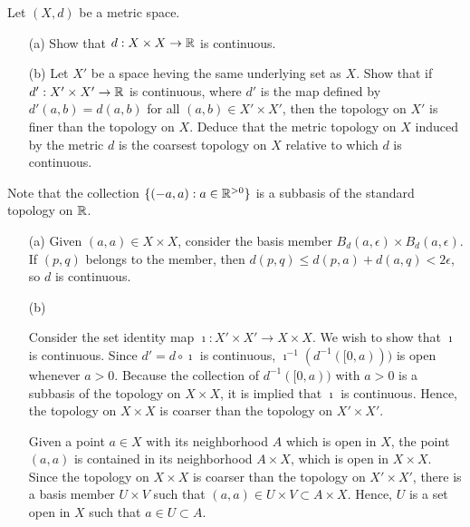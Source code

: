 \begin{prob}
    Let $(X, d)$ be a metric space.
    \begin{enumerate}
        \item[(a)]
            Show that $d: X\times X\rightarrow{\mathbb{R}}$ is continuous.
        \item[(b)]
            Let $X'$ be a space heving the same underlying set as $X$.
            Show that if $d': X'\times X'\rightarrow{\mathbb{R}}$ is continuous, where $d'$ is the map defined by $d'(a, b)=d(a, b)$ for all $(a, b)\in X'\times X'$, then the topology on $X'$ is finer than the topology on $X$.
            Deduce that the metric topology on $X$ induced by the metric $d$ is the coarsest topology on $X$ relative to which $d$ is continuous.
    \end{enumerate}
\end{prob}
\begin{sol}
    Note that the collection $\{(-a, a):a\in{\mathbb{R}}^{>0}\}$ is a subbasis of the standard topology on ${\mathbb{R}}$.
    \begin{enumerate}
        \item[(a)]
        {
            Given $(a, a)\in X\times X$, consider the basis member $B_d(a, \epsilon)\times B_d(a, \epsilon)$.
            If $(p, q)$ belongs to the member, then $d(p, q)\leq d(p, a)+d(a, q)<2\epsilon$, so $d$ is continuous.
        }
        \item[(b)]
        {
            Consider the set identity map $\imath: X'\times X'\rightarrow X\times X$.
            We wish to show that $\imath$ is continuous.
            Since $d'=d\circ\imath$ is continuous, $\imath^{-1}(d^{-1}([0, a)))$ is open whenever $a>0$.
            Because the collection of $d^{-1}([0, a))$ with $a>0$ is a subbasis of the topology on $X\times X$, it is implied that $\imath$ is continuous.
            Hence, the topology on $X\times X$ is coarser than the topology on $X'\times X'$.
            
            Given a point $a\in X$ with its neighborhood $A$ which is open in $X$, the point $(a, a)$ is contained in its neighborhood $A\times X$, which is open in $X\times X$.
            Since the topology on $X\times X$ is coarser than the topology on $X'\times X'$, there is a basis member $U\times V$ such that $(a, a)\in U\times V\subset A\times X$.
            Hence, $U$ is a set open in $X$ such that $a\in U\subset A$.
        }
    \end{enumerate}
\end{sol}